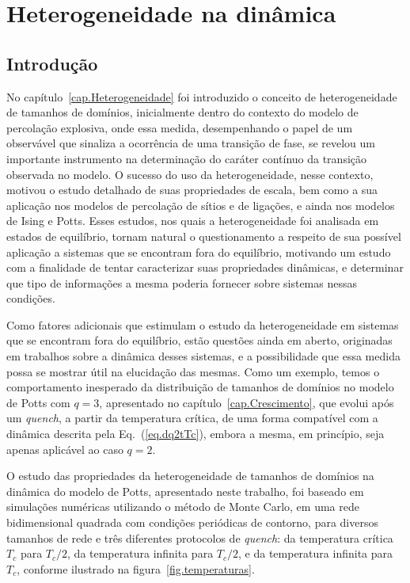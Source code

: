 \chapter{Heterogeneidade na dinâmica}
\label{cap.HetDinamica}
 
\section{Introdução}

No capítulo~\ref{cap.Heterogeneidade} foi introduzido o conceito de heterogeneidade de tamanhos de domínios, inicialmente dentro do contexto do modelo de percolação explosiva, onde essa medida, desempenhando o papel de um observável que sinaliza a ocorrência de uma transição de fase, se revelou um importante instrumento na determinação do caráter contínuo da transição observada no modelo. O sucesso do uso da heterogeneidade, nesse contexto, motivou o estudo detalhado de suas propriedades de escala, bem como a sua aplicação nos modelos de percolação de sítios e de ligações, e ainda nos modelos de Ising e Potts. Esses estudos, nos quais a heterogeneidade foi analisada em estados de equilíbrio, tornam natural o questionamento a respeito de sua possível aplicação a sistemas que se encontram fora do equilíbrio, motivando um estudo com a finalidade de tentar caracterizar suas propriedades dinâmicas, e determinar que tipo de informações a mesma poderia fornecer sobre sistemas nessas condições.

Como fatores adicionais que estimulam o estudo da heterogeneidade em sistemas que se encontram fora do equilíbrio, estão questões ainda em aberto, originadas em trabalhos sobre a dinâmica desses sistemas, e a possibilidade que essa medida possa se mostrar útil na elucidação das mesmas. Como um exemplo, temos o comportamento inesperado da distribuição de tamanhos de domínios no modelo de Potts com $q=3$, apresentado no capítulo~\ref{cap.Crescimento}, que evolui após um \textit{quench}, a partir da temperatura crítica, de uma forma compatível com a dinâmica descrita pela Eq.~(\ref{eq.dq2tTc}), embora a mesma, em princípio, seja apenas aplicável ao caso $q=2$.

O estudo das propriedades da heterogeneidade de tamanhos de domínios na dinâmica do modelo de Potts, apresentado neste trabalho, foi baseado em simulações numéricas utilizando o método de Monte Carlo, em uma rede bidimensional quadrada com condições periódicas de contorno, para diversos tamanhos de rede e três diferentes protocolos de \textit{quench}: da temperatura crítica $T_c$ para $T_c/2$, da temperatura infinita para $T_c/2$, e da temperatura infinita para $T_c$, conforme ilustrado na figura~\ref{fig.temperaturas}.

